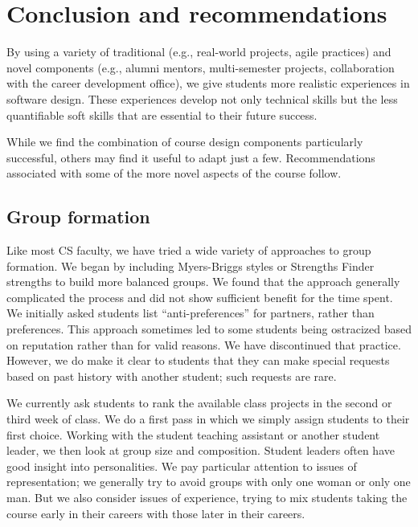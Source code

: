\section{Conclusion and recommendations}

By using a variety of traditional (e.g., real-world projects, agile
practices) and novel components (e.g., alumni mentors, multi-semester
projects, collaboration with the career development office), we
give students more realistic experiences in software design.  These
experiences develop not only technical skills but the less quantifiable
soft skills that are essential to their future success.

While we find the combination of course design components particularly
successful, others may find it useful to adapt just a few.  Recommendations
associated with some of the more novel aspects of the course follow.

\subsection{Group formation}


Like most CS faculty, we have tried a wide variety of approaches
to group formation.  We began by including Myers-Briggs styles or
Strengths Finder strengths to build more balanced groups.  We found
that the approach generally complicated the process and did not
show sufficient benefit for the time spent.  We initially asked
students list ``anti-preferences'' for partners, rather than
preferences.  This approach sometimes led to some students being
ostracized based on reputation rather than for valid reasons.  We
have discontinued that practice.  However, we do make it clear to
students that they can make special requests based on past history
with another student; such requests are rare.

We currently ask students to rank the available class projects in
the second or third week of class.  We do a first pass in which we
simply assign students to their first choice.  Working with the
student teaching assistant or another student leader, 
we then look at group size and composition.  Student leaders
often have good insight into personalities.  We pay particular
attention to issues of representation; we generally try to avoid
groups with only one woman or only one man.  But we also consider
issues of experience, trying to mix students taking the course early
in their careers with those later in their careers.

